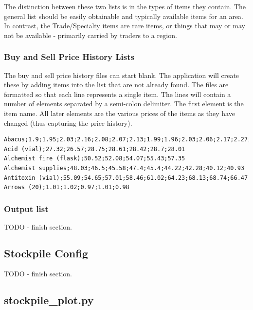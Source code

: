 The distinction between these two lists is in the types of items they contain. The general list should be easily obtainable and typically available items for an area. In contrast, the Trade/Specialty items are rare items, or things that may or may not be available - primarily carried by traders to a region.

\subsubsection{Buy and Sell Price History Lists \label{stockpile:buy and sell}}

The buy and sell price history files can start blank. The application will create these by adding items into the list that are not already found. The files are formatted so that each line represents a single item. The lines will contain a number of elements separated by a semi-colon delimiter. The first element is the item name. All later elements are the various prices of the items as they have changed (thus capturing the price history).

\begin{lstlisting}
Abacus;1.9;1.95;2.03;2.16;2.08;2.07;2.13;1.99;1.96;2.03;2.06;2.17;2.27;2.31
Acid (vial);27.32;26.57;28.75;28.61;28.42;28.7;28.01
Alchemist fire (flask);50.52;52.08;54.07;55.43;57.35
Alchemist supplies;48.03;46.5;45.58;47.4;45.4;44.22;42.28;40.12;40.93
Antitoxin (vial);55.09;54.65;57.01;58.46;61.02;64.23;68.13;68.74;66.47
Arrows (20);1.01;1.02;0.97;1.01;0.98
\end{lstlisting}

\subsubsection{Output list}




TODO - finish section.

\subsection{Stockpile Config\label{stockpile config}}

TODO - finish section.








\subsection{stockpile\_plot.py}

